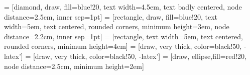% 
% 
% 



 = [diamond, draw, fill=blue!20,
    text width=4.5em, text badly centered, node distance=2.5cm, inner sep=1pt]
 = [rectangle, draw, fill=blue!20,
    text width=5em, text centered, rounded corners, minimum height=3em, node distance=2.2cm, inner sep=1pt]
 = [rectangle, 
    text width=5em, text centered, rounded corners, minimum height=4em]
 = [draw, very thick, color=black!50, -latex']
 = [draw, very thick, color=black!50, -latex']
 = [draw, ellipse,fill=red!20, node distance=2.5cm,
    minimum height=2em]

